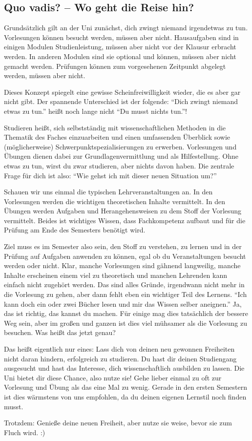 
\subsection{Quo vadis? -- Wo geht die Reise hin?}

Grundsätzlich gilt an der Uni zunächst, dich zwingt niemand irgendetwas zu tun. Vorlesungen können besucht werden, müssen aber nicht. Hausaufgaben sind in einigen Modulen Studienleistung, müssen aber nicht vor der Klausur erbracht werden. In anderen Modulen sind sie optional und können, müssen aber nicht gemacht werden. Prüfungen können zum vorgesehenen Zeitpunkt abgelegt werden, müssen aber nicht.

Dieses Konzept spiegelt eine gewisse Scheinfreiwilligkeit wieder, die es aber gar nicht gibt. Der spannende Unterschied ist der folgende: \enquote{Dich zwingt niemand etwas zu tun.} heißt noch lange nicht \enquote{Du musst nichts tun.}!

Studieren heißt, sich selbstständig mit wissenschaftlichen Methoden in die Thematik des Faches einzuarbeiten und einen umfassenden Überblick sowie (möglicherweise) Schwerpunktspezialisierungen zu erwerben. Vorlesungen und Übungen dienen dabei zur Grundlagenvermittlung und als Hilfestellung. Ohne etwas zu tun, wirst du zwar studieren, aber nichts davon haben. Die zentrale Frage für dich ist also: \enquote{Wie gehst ich mit dieser neuen Situation um?}

Schauen wir uns einmal die typischen Lehrveranstaltungen an. In den Vorlesungen werden die wichtigen theoretischen Inhalte vermittelt. In den Übungen werden Aufgaben und Herangehensweisen zu dem Stoff der Vorlesung vermittelt. Beides ist wichtiges Wissen, dass Fachkompetenz aufbaut und für die Prüfung am Ende des Semesters benötigt wird.

Ziel muss es im Semester also sein, den Stoff zu verstehen, zu lernen und in der Prüfung auf Aufgaben anwenden zu können, egal ob du Veranstaltungen besucht werden oder nicht. Klar, manche Vorlesungen sind gähnend langweilig, manche Inhalte erscheinen einem viel zu theoretisch und manchen Lehrenden kann einfach nicht zugehört werden. Das sind alles Gründe, irgendwann nicht mehr in die Vorlesung zu gehen, aber dann fehlt eben ein wichtiger Teil des Lernens. \enquote{Ich kann doch ein oder zwei Bücher lesen und mir das Wissen selber aneignen.} Ja, das ist richtig, das kannst du machen. Für einige mag dies tatsächlich der bessere Weg sein, aber im großen und ganzen ist dies viel mühsamer als die Vorlesung zu besuchen. Was heißt das jetzt genau?

Das heißt eigentlich nur eines: Lass dich von deinen neu gewonnen Freiheiten nicht daran hindern, erfolgreich zu studieren. Du hast dir deinen Studiengang ausgesucht und hast das Interesse, dich wissenschaftlich ausbilden zu lassen. Die Uni bietet dir diese Chance, also nutze sie! Gehe lieber einmal zu oft zur Vorlesung und Übung als das eine Mal zu wenig. Gerade in den ersten Semestern ist dies wärmstens von uns empfohlen, da du deinen eigenen Lernstil noch finden musst.

Trotzdem: Genieße deine neuen Freiheit, aber nutze sie weise, bevor sie zum Fluch wird. :)
